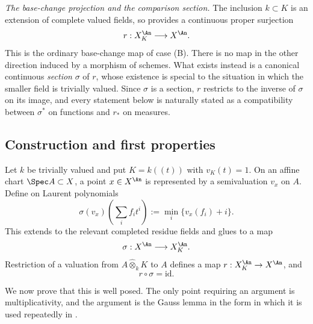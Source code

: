 \emph{The base-change projection and the comparison section.}  The inclusion
$k\subset K$ is an extension of complete valued fields, so
 provides a continuous proper surjection
\[
 r:X_K^{\An}\longrightarrow X^{\An} .
\]
This is the ordinary base-change map of case (B).  There is no map in the
other direction induced by a morphism of schemes.  What exists instead is a
canonical continuous \emph{section} $\sigma$ of $r$, whose existence is
special to the situation in which the smaller field is trivially valued.
Since $\sigma$ is a section, $r$ restricts to the inverse of $\sigma$ on
its image, and every statement below is naturally stated as a compatibility
between $\sigma^*$ on functions and $r_*$ on measures.

\subsection{Construction and first properties}
\label{sec:ch30-gauss-construction}

Let $k$ be trivially valued and put $K=k((t))$ with $v_K(t)=1$.  On an
affine chart $\Spec A\subset X$, a point $x\in X^{\An}$ is represented
by a semivaluation $v_x$ on $A$.  Define on Laurent polynomials
\begin{equation}
\label{eq:gauss-extension}
 \sigma(v_x)\left(\sum_i f_it^i\right)
       :=\min_i\{v_x(f_i)+i\}.
\end{equation}
This extends to the relevant completed residue fields and glues to a map
\[
              \sigma:X^{\An}\longrightarrow X_K^{\An}.
\]
Restriction of a valuation from $A\widehat\otimes_kK$ to $A$ defines a
map $r:X_K^{\An}\to X^{\An}$, and
\begin{equation}
\label{eq:gauss-section}
                              r\circ\sigma=\mathrm{id}.
\end{equation}

We now prove that this is well posed.  The only point requiring an argument
is multiplicativity, and the argument is the Gauss lemma in the form in
which it is used repeatedly in .


